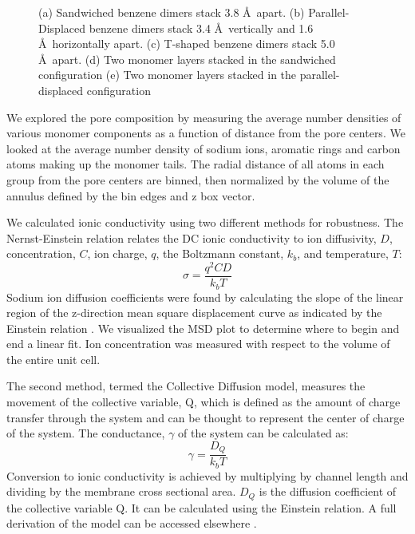 \documentclass{article}
\newcommand{\angstrom}{\textup{\AA}}
\begin{document}
\begin{figure}
\begin{subfigure}[b]{0.475\textwidth}
		\caption{}\label{fig:offsetlayers}
	\end{subfigure}
	\caption{(a) Sandwiched benzene dimers stack 3.8 \angstrom~apart. (b) Parallel-Displaced benzene dimers stack
	3.4 \angstrom~vertically and 1.6 \angstrom~horizontally apart. (c) T-shaped benzene dimers stack 5.0 \angstrom~apart. 
	(d) Two monomer layers stacked in the sandwiched configuration (e) Two monomer layers stacked in the parallel-displaced
	configuration }\label{fig:stacking}
  \end{figure}
  
  We explored the pore composition by measuring the average number densities of
  various monomer components as a function of distance from the pore centers.  We
  looked at the average number density of sodium ions, aromatic rings and carbon
  atoms making up the monomer tails. The radial distance of all atoms in each
  group from the pore centers are binned, then normalized by the volume of the
  annulus defined by the bin edges and z box vector.

  We calculated ionic conductivity using two different methods for robustness.
  The Nernst-Einstein relation relates the DC ionic conductivity to ion
  diffusivity, $D$, concentration, $C$, ion charge, $q$, the Boltzmann constant,
  $k_b$, and temperature, $T$: $$\sigma = \dfrac{q^2CD}{k_b T}$$ 
  Sodium ion diffusion coefficients were found by calculating the slope
  of the linear region of the z-direction mean square displacement curve as
  indicated by the Einstein relation \cite{einstein_investigations_1956}. We
  visualized the MSD plot to determine where to begin and end a linear fit. Ion
  concentration was measured with respect to the volume of the entire unit cell. 

  The second method, termed the Collective Diffusion model, measures the
  movement of the collective variable, Q, which is defined as the amount of
  charge transfer through the system and can be thought to represent the center
  of charge of the system. The conductance, $\gamma$ of the system can be
  calculated as: $$ \gamma = \dfrac{D_Q}{k_b T} $$ Conversion to ionic
  conductivity is achieved by multiplying by channel length and dividing by the
  membrane cross sectional area.  $D_Q$ is the diffusion coefficient of the
  collective variable Q. It can be calculated using the Einstein relation.  A
  full derivation of the model can be accessed elsewhere 
  \cite{liu_collective_2013}.
\end{document}

